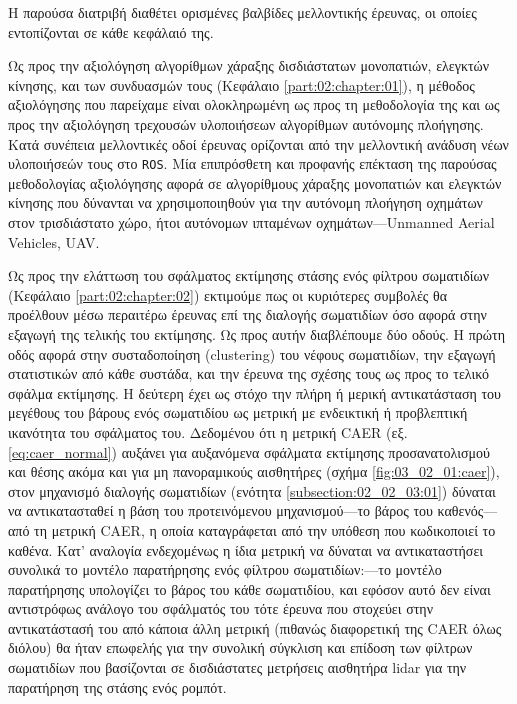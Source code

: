 Η παρούσα διατριβή διαθέτει ορισμένες βαλβίδες μελλοντικής έρευνας, οι οποίες
εντοπίζονται σε κάθε κεφάλαιό της.

Ως προς την αξιολόγηση αλγορίθμων χάραξης δισδιάστατων μονοπατιών, ελεγκτών
κίνησης, και των συνδυασμών τους (Κεφάλαιο \ref{part:02:chapter:01}), η μέθοδος
αξιολόγησης που παρείχαμε είναι ολοκληρωμένη ως προς τη μεθοδολογία της και ως
προς την αξιολόγηση τρεχουσών υλοποιήσεων αλγορίθμων αυτόνομης πλοήγησης. Κατά
συνέπεια μελλοντικές οδοί έρευνας ορίζονται από την μελλοντική ανάδυση νέων
υλοποιήσεών τους στο \texttt{ROS}. Μία επιπρόσθετη και προφανής επέκταση της
παρούσας μεθοδολογίας αξιολόγησης αφορά σε αλγορίθμους χάραξης μονοπατιών και
ελεγκτών κίνησης που δύνανται να χρησιμοποιηθούν για την αυτόνομη πλοήγηση
οχημάτων στον τρισδιάστατο χώρο, ήτοι αυτόνομων ιπταμένων οχημάτων---Unmanned
Aerial Vehicles, UAV.

Ως προς την ελάττωση του σφάλματος εκτίμησης στάσης ενός φίλτρου σωματιδίων
(Κεφάλαιο \ref{part:02:chapter:02}) εκτιμούμε πως οι κυριότερες συμβολές θα
προέλθουν μέσω περαιτέρω έρευνας επί της διαλογής σωματιδίων όσο αφορά στην
εξαγωγή της τελικής του εκτίμησης. Ως προς αυτήν διαβλέπουμε δύο οδούς. Η πρώτη
οδός αφορά στην συσταδοποίηση (clustering) του νέφους σωματιδίων, την εξαγωγή
στατιστικών από κάθε συστάδα, και την έρευνα της σχέσης τους ως προς το τελικό
σφάλμα εκτίμησης.  Η δεύτερη έχει ως στόχο την πλήρη ή μερική αντικατάσταση του
μεγέθους του βάρους ενός σωματιδίου ως μετρική με ενδεικτική ή προβλεπτική
ικανότητα του σφάλματος του.  Δεδομένου ότι η μετρική CAER (εξ.
\ref{eq:caer_normal}) αυξάνει για αυξανόμενα σφάλματα εκτίμησης προσανατολισμού
και θέσης ακόμα και για μη πανοραμικούς αισθητήρες (σχήμα
\ref{fig:03_02_01:caer}), στον μηχανισμό διαλογής σωματιδίων (ενότητα
\ref{subsection:02_02_03:01}) δύναται να αντικατασταθεί η βάση του
προτεινόμενου μηχανισμού---το βάρος του καθενός---από τη μετρική CAER, η οποία
καταγράφεται από την υπόθεση που κωδικοποιεί το καθένα. Κατ' αναλογία
ενδεχομένως η ίδια μετρική να δύναται να αντικαταστήσει συνολικά το μοντέλο
παρατήρησης ενός φίλτρου σωματιδίων:---το μοντέλο παρατήρησης υπολογίζει το
βάρος του κάθε σωματιδίου, και εφόσον αυτό δεν είναι αντιστρόφως ανάλογο του
σφάλματός του τότε έρευνα που στοχεύει στην αντικατάστασή του από κάποια άλλη
μετρική (πιθανώς διαφορετική της CAER όλως διόλου) θα ήταν επωφελής για την
συνολική σύγκλιση και επίδοση των φίλτρων σωματιδίων που βασίζονται σε
δισδιάστατες μετρήσεις αισθητήρα lidar για την παρατήρηση της στάσης ενός
ρομπότ.

